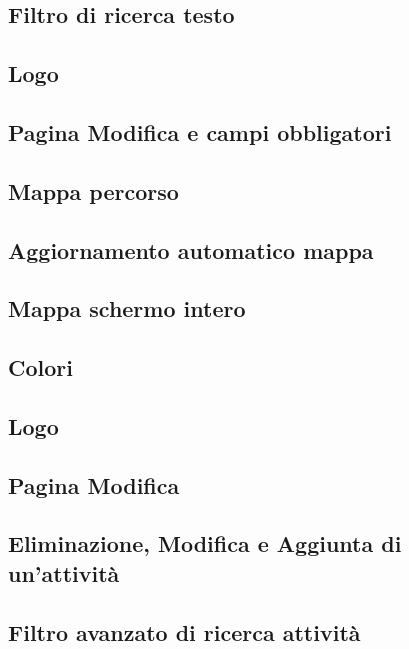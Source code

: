 \subsection{Filtro di ricerca testo}

\subsection{Logo}

\subsection{Pagina Modifica e campi obbligatori}

\subsection{Mappa percorso}

\subsection{Aggiornamento automatico mappa}

\subsection{Mappa schermo intero}

\subsection{Colori}

\subsection{Logo}

\subsection{Pagina Modifica}

\subsection{Eliminazione, Modifica e Aggiunta di un'attività}

\subsection{Filtro avanzato di ricerca attività}


